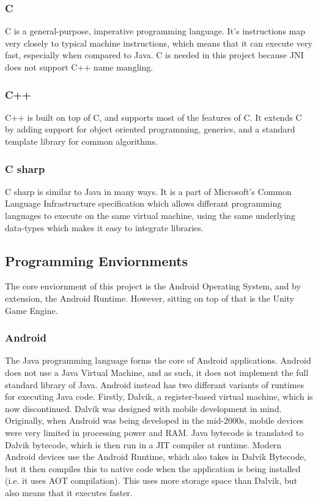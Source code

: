         \subsubsection{C}
        C is a general-purpose, imperative programming language. It's instructions map very closely to typical machine instructions, which means that it can execute very fast, especially when compared to Java. C is needed in this project because JNI does not support C++ name mangling.
        \subsubsection{C++}
        C++ is built on top of C, and supports most of the features of C. It extends C by adding support for object oriented programming, generics, and a standard template library for common algorithms.
        \subsubsection{C sharp}
        C sharp is similar to Java in many ways. It is a part of Microsoft's Common Language Infrastructure specification which allows differant programming languages to execute on the same virtual machine, using the same underlying data-types which makes it easy to integrate libraries.

    \subsection{Programming Enviornments}
    The core enviornment of this project is the Android Operating System, and by extension, the Android Runtime. However, sitting on top of that is the Unity Game Engine.
        \subsubsection{Android}
        The Java programming language forms the core of Android applications. Android does not use a Java Virtual Machine, and as such, it does not implement the full standard library of Java. Android instead has two differant variants of runtimes for executing Java code. Firstly, Dalvik, a register-based virtual machine, which is now discontinued. Dalvik was designed with mobile development in mind. Originally, when Android was being developed in the mid-2000s, mobile devices were very limited in processing power and RAM. Java bytecode is translated to Dalvik bytecode, which is then run in a JIT compiler at runtime. Modern Android devices use the Android Runtime, which also takes in Dalvik Bytecode, but it then compiles this to native code when the application is being installed (i.e. it uses AOT compilation). This uses more storage space than Dalvik, but also means that it executes faster.

